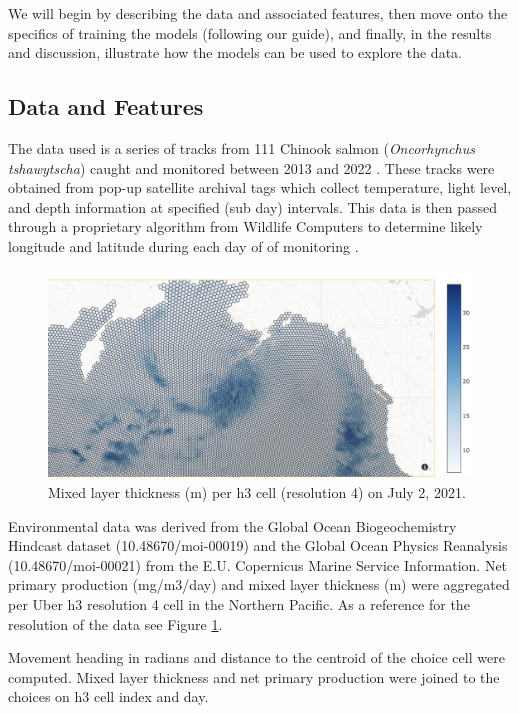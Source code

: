 \documentclass[11pt]{article}
\begin{document}
We will begin by describing the data and associated features, then move onto the specifics of training the models (following our guide), and finally, in the results and discussion, illustrate how the models can be used to explore the data. 

\subsection*{Data and Features}

The data used is a series of tracks from 111 Chinook salmon (\textit{Oncorhynchus tshawytscha}) caught and monitored between 2013 and 2022 \citep{tags1} \citep{tags2}. These tracks were obtained from pop-up satellite archival tags which collect temperature, light level, and depth information at specified (sub day) intervals. This data is then passed through a proprietary algorithm from Wildlife Computers to determine likely longitude and latitude during each day of of monitoring \citep{PSAT}. \newline

\begin{figure}[h!] 
	\centering
  \includegraphics[height=55mm]{figures/mlt_2021_07_02.png}
  \caption{Mixed layer thickness (m) per h3 cell (resolution 4) on July 2, 2021.}
  \label{fig:mlt}
\end{figure}

Environmental data was derived from the Global Ocean Biogeochemistry Hindcast dataset (10.48670/moi-00019) and the Global Ocean Physics Reanalysis (10.48670/moi-00021) from the E.U. Copernicus Marine Service Information. Net primary production (mg/m3/day) and mixed layer thickness (m) were aggregated per Uber h3 resolution 4 cell in the Northern Pacific. As a reference for the resolution of the data see Figure \ref{fig:mlt}. \newline

Movement heading in radians and distance to the centroid of the choice cell were computed. Mixed layer thickness and net primary production were joined to the choices on h3 cell index and day.
\end{document}
